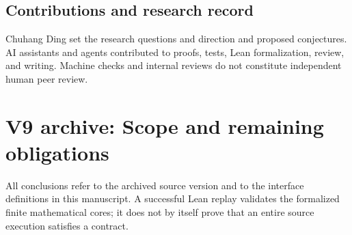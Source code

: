 \documentclass[
  11pt,
]{article}
\begin{document}
\subsection{Contributions and research
record}\label{v8-contributions-and-research-record}

Chuhang Ding set the research questions and direction and proposed conjectures. AI assistants and agents contributed to proofs, tests, Lean formalization, review, and writing. Machine checks and internal reviews do not constitute independent human peer review.

\section{V9 archive: Scope and remaining obligations}\label{v9-section-coverage}

All conclusions refer to the archived source version and to the
interface definitions in this manuscript. A successful Lean replay
validates the formalized finite mathematical cores; it does not by
itself prove that an entire source execution satisfies a contract.
\end{document}
